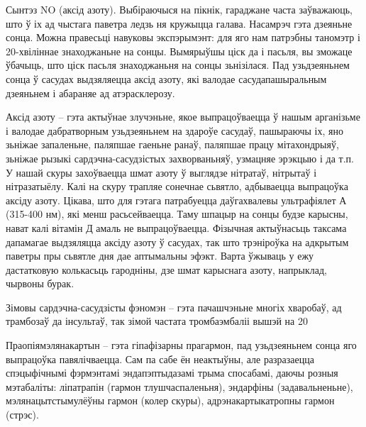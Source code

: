 Сынтэз NO (аксід азоту). Выбіраючыся на пікнік, гараджане часта заўважаюць, што ў іх ад чыстага паветра ледзь ня кружыцца галава. Насамрэч гэта дзеяньне сонца. Можна правесьці навуковы экспэрымэнт: для яго нам патрэбны таномэтр і 20-хвіліннае знаходжаньне на сонцы. Вымярыўшы ціск да і пасьля, вы зможаце ўбачыць, што ціск пасьля знаходжаньня на сонцы зьнізілася. Пад узьдзеяньнем сонца ў сасудах выдзяляецца аксід азоту, які валодае сасудапашыральным дзеяньнем і абараняе ад атэрасклерозу.

Аксід азоту – гэта актыўнае злучэньне, якое выпрацоўваецца ў нашым арганізьме і валодае дабратворным узьдзеяньнем на здароўе сасудаў, пашыраючы іх, яно зьніжае запаленьне, паляпшае гаеньне ранаў, паляпшае працу мітахондрыяў, зьніжае рызыкі сардэчна-сасудзістых захворваньняў, узмацняе эрэкцыю і да т.п. У нашай скуры захоўваецца шмат азоту ў выглядзе нітратаў, нітрытаў і нітразатыёлу. Калі на скуру трапляе сонечнае сьвятло, адбываецца выпрацоўка аксіду азоту. Цікава, што для гэтага патрабуецца даўгахвалевы ультрафіялет А (315-400 нм), які менш расьсейваецца. Таму шпацыр на сонцы будзе карысны, нават калі вітамін Д амаль не выпрацоўваецца. Фізычная актыўнасьць таксама дапамагае выдзяляцца аксіду азоту ў сасудах, так што трэніроўка на адкрытым паветры пры сьвятле дня дае аптымальны эфэкт. Варта ўжываць у ежу дастатковую колькасьць гародніны, дзе шмат карыснага азоту, напрыклад, чырвоны бурак.

Зімовы сардэчна-сасудзісты фэномэн – гэта пачашчэньне многіх хваробаў, ад трамбозаў да інсультаў, так зімой частата тромбаэмбаліі вышэй на 20%

Праопіямэлянакартын – гэта гіпафізарны прагармон, пад узьдзеяньнем сонца яго выпрацоўка павялічваецца. Сам па сабе ён неактыўны, але разразаецца спэцыфічнымі фэрмэнтамі эндапэптыдазамі трыма спосабамі, даючы розныя мэтабаліты: ліпатрапін (гармон тлушчаспаленьня), эндарфіны (задавальненьне), мэлянацытстымулёўны гармон (колер скуры), адрэнакартыкатропны гармон (стрэс).

